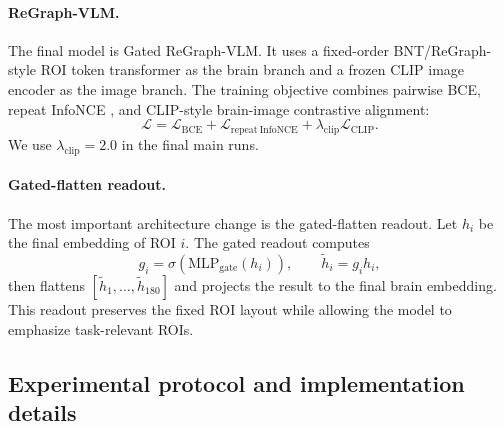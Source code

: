 \documentclass{article}
\begin{document}
\paragraph{ReGraph-VLM.}
The final model is Gated ReGraph-VLM. It uses a fixed-order BNT/ReGraph-style ROI token transformer as the brain branch and a frozen CLIP image encoder \citep{radford2021clip} as the image branch. The training objective combines pairwise BCE, repeat InfoNCE \citep{oord2018infonce}, and CLIP-style brain-image contrastive alignment:
\begin{equation}
  \mathcal{L} = \mathcal{L}_{\mathrm{BCE}} + \mathcal{L}_{\mathrm{repeat\ InfoNCE}} + \lambda_{\mathrm{clip}}\mathcal{L}_{\mathrm{CLIP}}.
\end{equation}
We use $\lambda_{\mathrm{clip}}=2.0$ in the final main runs.

\paragraph{Gated-flatten readout.}
The most important architecture change is the gated-flatten readout. Let $h_i$ be the final embedding of ROI $i$. The gated readout computes
\begin{equation}
  g_i = \sigma(\mathrm{MLP}_{\mathrm{gate}}(h_i)), \qquad \tilde{h}_i = g_i h_i,
\end{equation}
then flattens $[\tilde{h}_1,\ldots,\tilde{h}_{180}]$ and projects the result to the final brain embedding. This readout preserves the fixed ROI layout while allowing the model to emphasize task-relevant ROIs.

\subsection{Experimental protocol and implementation details}
\end{document}
